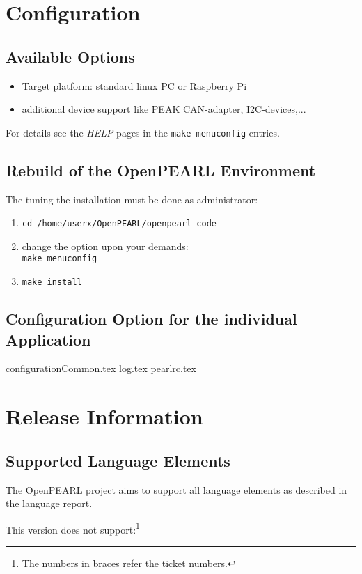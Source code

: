 \documentclass[oneside,10pt]{scrbook}
\begin{document}
\chapter{Configuration}
\section{Available Options}
\begin{itemize}
\item Target platform: standard linux PC or Raspberry Pi
\item additional device support like PEAK CAN-adapter, I2C-devices,...
\end{itemize}
For details see the {\em HELP} pages in the \verb|make menuconfig| 
entries.

\section{Rebuild of the OpenPEARL Environment}
The tuning the installation must be done as administrator:
\begin{enumerate}
\item \verb|cd /home/userx/OpenPEARL/openpearl-code|
\item change the option upon your demands:\\
      \verb|make menuconfig| 
\item \verb|make install|
\end{enumerate}

\section{Configuration Option for the individual Application}
{configurationCommon.tex}
{log.tex}
{pearlrc.tex}

\chapter{Release Information}
\section{Supported Language Elements}
The OpenPEARL project aims to support all language elements  as
described in the language report.

This version does not support:\footnote{The numbers in braces refer the ticket numbers.}
\end{document}
